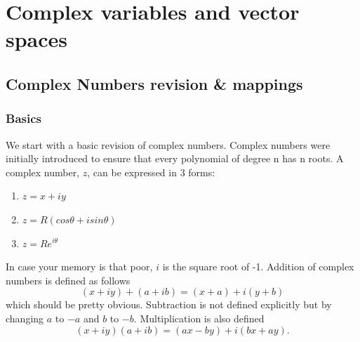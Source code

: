\chapter{Complex variables and vector spaces}
\minitoc
\pagebreak
\section{Complex Numbers revision \& mappings}
\subsection{Basics}
We start with a basic revision of complex numbers.
 Complex numbers were initially introduced to ensure that every polynomial of degree n has n roots. 
 A complex number, $z$, can be expressed in 3 forms:
\begin{enumerate}
	\item $z=x+iy$
	\item $z=R(cos\theta+isin\theta)$
	\item $z=Re^{i\theta}$
\end{enumerate}
In case your memory is that poor, $i$ is the square root of -1.
 Addition of complex numbers is defined as follows $$(x+iy) + (a+ib) = (x+a) + i(y+b) $$
which should be pretty obvious.
 Subtraction is not defined explicitly but by changing $a$ to $-a$ and $b$ to $-b$.
  Multiplication is also defined $$(x+iy)(a+ib) = (ax-by)+i(bx+ay).$$
